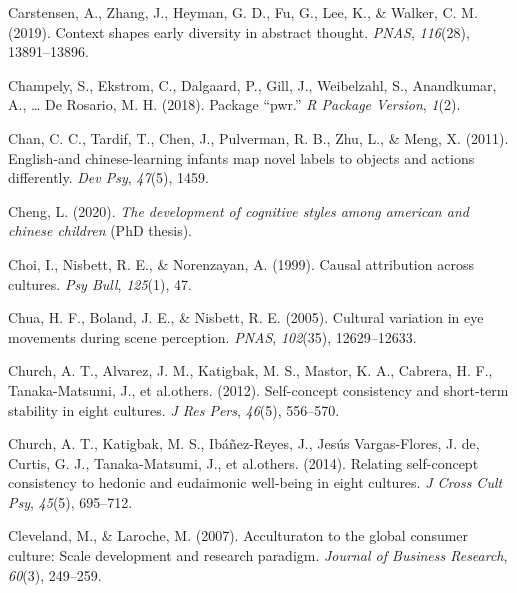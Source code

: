 \documentclass[
  man,floatsintext]{apa6}
\newlength{\cslhangindent}
\newlength{\cslentryspacingunit} %
\newenvironment{CSLReferences}[2] %
 {%
  \setlength{\parindent}{0pt}
  \ifodd #1
  \let\oldpar\par
  \def\par{\hangindent=\cslhangindent\oldpar}
  \fi
  \setlength{\parskip}{#2\cslentryspacingunit}
 }%
 {}
\begin{document}
\begin{CSLReferences}{1}{0}
\leavevmode{}%
Carstensen, A., Zhang, J., Heyman, G. D., Fu, G., Lee, K., \& Walker, C. M. (2019). Context shapes early diversity in abstract thought. \emph{PNAS}, \emph{116}(28), 13891--13896.

\leavevmode{}%
Champely, S., Ekstrom, C., Dalgaard, P., Gill, J., Weibelzahl, S., Anandkumar, A., \ldots{} De Rosario, M. H. (2018). Package {``pwr.''} \emph{R Package Version}, \emph{1}(2).

\leavevmode{}%
Chan, C. C., Tardif, T., Chen, J., Pulverman, R. B., Zhu, L., \& Meng, X. (2011). English-and chinese-learning infants map novel labels to objects and actions differently. \emph{Dev Psy}, \emph{47}(5), 1459.

\leavevmode{}%
Cheng, L. (2020). \emph{The development of cognitive styles among american and chinese children} (PhD thesis).

\leavevmode{}%
Choi, I., Nisbett, R. E., \& Norenzayan, A. (1999). Causal attribution across cultures. \emph{Psy Bull}, \emph{125}(1), 47.

\leavevmode{}%
Chua, H. F., Boland, J. E., \& Nisbett, R. E. (2005). Cultural variation in eye movements during scene perception. \emph{PNAS}, \emph{102}(35), 12629--12633.

\leavevmode{}%
Church, A. T., Alvarez, J. M., Katigbak, M. S., Mastor, K. A., Cabrera, H. F., Tanaka-Matsumi, J., et al.others. (2012). Self-concept consistency and short-term stability in eight cultures. \emph{J Res Pers}, \emph{46}(5), 556--570.

\leavevmode{}%
Church, A. T., Katigbak, M. S., Ibáñez-Reyes, J., Jesús Vargas-Flores, J. de, Curtis, G. J., Tanaka-Matsumi, J., et al.others. (2014). Relating self-concept consistency to hedonic and eudaimonic well-being in eight cultures. \emph{J Cross Cult Psy}, \emph{45}(5), 695--712.

\leavevmode{}%
Cleveland, M., \& Laroche, M. (2007). Acculturaton to the global consumer culture: Scale development and research paradigm. \emph{Journal of Business Research}, \emph{60}(3), 249--259.


\end{CSLReferences}
\end{document}
